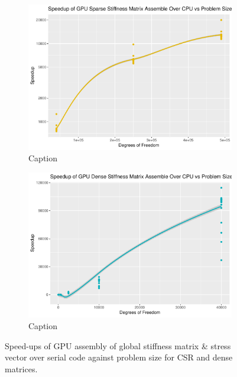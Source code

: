 \begin{figure}
	\centering
	\begin{subfigure}{0.48\linewidth}
		\centering
		\includegraphics[width = \linewidth]{Plots/assem_dev_cpu_sparse_speedup_vs_n}
		\caption{Caption}
		\label{fig:assem_sparse_n}
	\end{subfigure}\hfill
	\begin{subfigure}{0.48\linewidth}
		\centering
		\includegraphics[width=\linewidth]{Plots/assem_dev_cpu_dense_speedup_vs_n}
		\caption{Caption}
		\label{fig:assem_dense_n}
	\end{subfigure}
	\caption{Speed-ups of GPU assembly of global stiffness matrix \& stress vector over serial code against problem size for CSR and dense matrices.}
	\label{fig:assem_su_n}
\end{figure}


